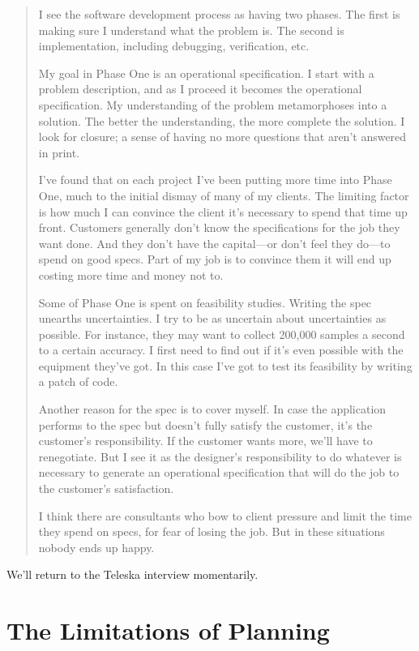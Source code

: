 \begin{quotation}
\noindent I see the software development process as having two phases. The first is
making sure I understand what the problem is. The second is
implementation, including debugging, verification, etc.

\noindent My goal in Phase One is an operational specification. I start with a problem
description, and as I proceed it becomes the operational specification. My
understanding of the problem metamorphoses into a solution. The better
the understanding, the more complete the solution. I look for closure; a
sense of having no more questions that aren't answered in print.

\noindent I've found that on each project I've been putting more time into Phase One,
much to the initial dismay of many of my clients. The limiting factor is how
much I can convince the client it's necessary to spend that time up front.
Customers generally don't know the specifications for the job they want
done. And they don't have the capital---or don't feel they do---to spend on
good specs. Part of my job is to convince them it will end up costing more
time and money not to.

\noindent Some of Phase One is spent on feasibility studies. Writing the spec
unearths uncertainties. I try to be as uncertain about uncertainties as
possible. For instance, they may want to collect 200,000 samples a second to a
certain accuracy. I first need to find out if it's even possible with the
equipment they've got. In this case I've got to test its feasibility by writing a
patch of code.

\noindent Another reason for the spec is to cover myself. In case the application
performs to the spec but doesn't fully satisfy the customer, it's the customer's
responsibility. If the customer wants more, we'll have to renegotiate. But I
see it as the designer's responsibility to do whatever is necessary to
generate an operational specification that will do the job to the customer's
satisfaction.

\noindent I think there are consultants who bow to client pressure and limit the time
they spend on specs, for fear of losing the job. But in these situations
nobody ends up happy.
\end{quotation}
\blackline{2ex}

\noindent We'll return to the Teleska interview momentarily.

\section{The Limitations of Planning}

